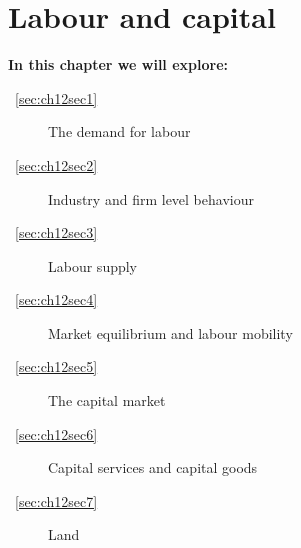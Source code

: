 \chapter{Labour and capital} \label{chap:marketlabourcapital}

\begin{topics}
\textbf{In this chapter we will explore:}
\begin{description}
\item [~\ref{sec:ch12sec1}] The demand for labour
\item [~\ref{sec:ch12sec2}] Industry and firm level behaviour
\item [~\ref{sec:ch12sec3}] Labour supply
\item [~\ref{sec:ch12sec4}] Market equilibrium and labour mobility
\item [~\ref{sec:ch12sec5}] The capital market
\item [~\ref{sec:ch12sec6}] Capital services and capital goods
\item [~\ref{sec:ch12sec7}] Land
\end{description}
\end{topics}